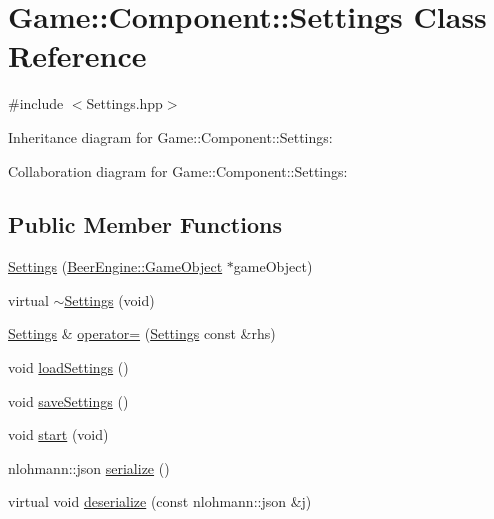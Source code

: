 \hypertarget{class_game_1_1_component_1_1_settings}{}\section{Game\+:\+:Component\+:\+:Settings Class Reference}
\label{class_game_1_1_component_1_1_settings}


{\ttfamily \#include $<$Settings.\+hpp$>$}



Inheritance diagram for Game\+:\+:Component\+:\+:Settings\+:


Collaboration diagram for Game\+:\+:Component\+:\+:Settings\+:
\subsection*{Public Member Functions}
\begin{DoxyCompactItemize}
\item 
\mbox{\hyperlink{class_game_1_1_component_1_1_settings_a2a0d16fdd698140da965cd3367601a49}{Settings}} (\mbox{\hyperlink{class_beer_engine_1_1_game_object}{Beer\+Engine\+::\+Game\+Object}} $\ast$game\+Object)
\item 
virtual \mbox{\hyperlink{class_game_1_1_component_1_1_settings_ad6ce9d5380a251f7a46c4360419211eb}{$\sim$\+Settings}} (void)
\item 
\mbox{\hyperlink{class_game_1_1_component_1_1_settings}{Settings}} \& \mbox{\hyperlink{class_game_1_1_component_1_1_settings_a8744e8a07e0c730945508836912a7609}{operator=}} (\mbox{\hyperlink{class_game_1_1_component_1_1_settings}{Settings}} const \&rhs)
\item 
void \mbox{\hyperlink{class_game_1_1_component_1_1_settings_a8edddda1b5367a5343f2182750f0f36b}{load\+Settings}} ()
\item 
void \mbox{\hyperlink{class_game_1_1_component_1_1_settings_ad8883dfb4a2ae8a041e293e73c7a6dc5}{save\+Settings}} ()
\item 
void \mbox{\hyperlink{class_game_1_1_component_1_1_settings_adc79077ed00bee2d8ed987ea4b86a331}{start}} (void)
\item 
nlohmann\+::json \mbox{\hyperlink{class_game_1_1_component_1_1_settings_a1e378dbe2c0c7a198eae234e5979e91f}{serialize}} ()
\item 
virtual void \mbox{\hyperlink{class_game_1_1_component_1_1_settings_ae9edc71830f43d318f8dbcedce2d8bf9}{deserialize}} (const nlohmann\+::json \&j)
\end{DoxyCompactItemize}
